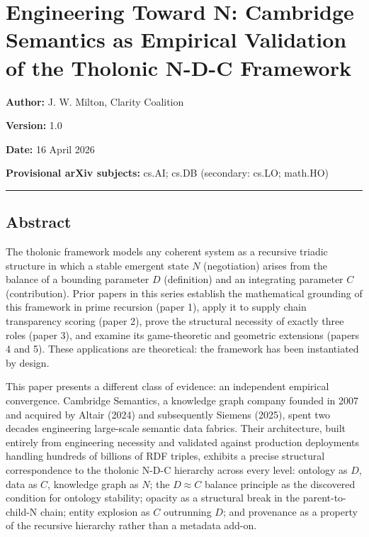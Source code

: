 \documentclass[
  11pt,
  letterpaper,
]{article}
\author{}
\date{}
\begin{document}
\section{Engineering Toward N: Cambridge Semantics as Empirical
Validation of the Tholonic N-D-C
Framework}\label{engineering-toward-n-cambridge-semantics-as-empirical-validation-of-the-tholonic-n-d-c-framework}

\textbf{Author:} J. W. Milton, Clarity Coalition

\textbf{Version:} 1.0

\textbf{Date:} 16 April 2026

\textbf{Provisional arXiv subjects:} cs.AI; cs.DB (secondary: cs.LO;
math.HO)

\begin{center}\rule{0.5\linewidth}{0.5pt}\end{center}

\subsection{Abstract}\label{abstract}

The tholonic framework models any coherent system as a recursive triadic
structure in which a stable emergent state \(N\) (negotiation) arises
from the balance of a bounding parameter \(D\) (definition) and an
integrating parameter \(C\) (contribution). Prior papers in this series
establish the mathematical grounding of this framework in prime
recursion (paper 1), apply it to supply chain transparency scoring
(paper 2), prove the structural necessity of exactly three roles (paper
3), and examine its game-theoretic and geometric extensions (papers 4
and 5). These applications are theoretical: the framework has been
instantiated by design.

This paper presents a different class of evidence: an independent
empirical convergence. Cambridge Semantics, a knowledge graph company
founded in 2007 and acquired by Altair (2024) and subsequently Siemens
(2025), spent two decades engineering large-scale semantic data fabrics.
Their architecture, built entirely from engineering necessity and
validated against production deployments handling hundreds of billions
of RDF triples, exhibits a precise structural correspondence to the
tholonic N-D-C hierarchy across every level: ontology as \(D\), data as
\(C\), knowledge graph as \(N\); the \(D \approx C\) balance principle
as the discovered condition for ontology stability; opacity as a
structural break in the parent-to-child-N chain; entity explosion as
\(C\) outrunning \(D\); and provenance as a property of the recursive
hierarchy rather than a metadata add-on.
\end{document}
